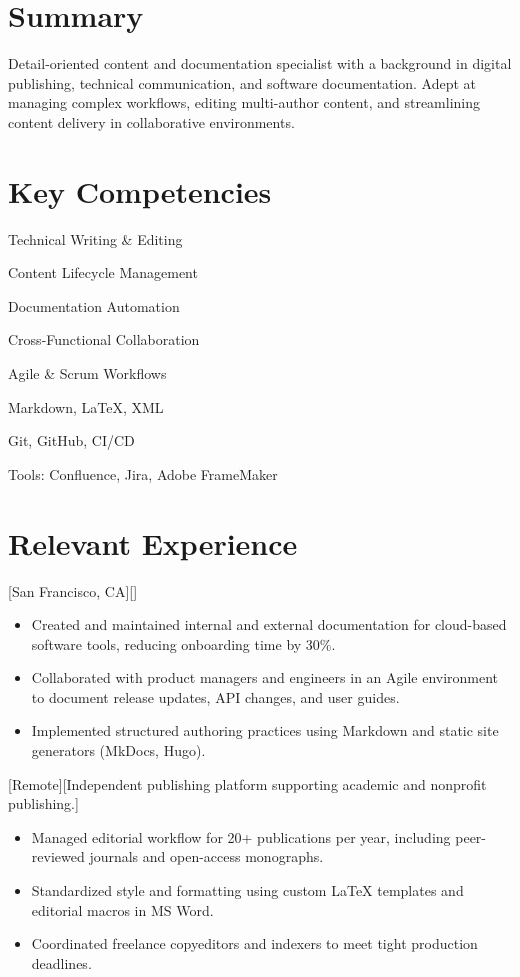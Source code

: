 \documentclass{stitched}
\begin{document}
\section*{Summary}
Detail-oriented content and documentation specialist with a background in digital publishing, technical communication, and software documentation. Adept at managing complex workflows, editing multi-author content, and streamlining content delivery in collaborative environments.
\section*{Key Competencies}
\begin{skills}
\item Technical Writing \& Editing
\item Content Lifecycle Management
\item Documentation Automation
\item Cross-Functional Collaboration
\item Agile \& Scrum Workflows
\item Markdown, LaTeX, XML
\item Git, GitHub, CI/CD
\item Tools: Confluence, Jira, Adobe FrameMaker

\end{skills}

\section*{Relevant Experience}

        [San Francisco, CA][]
        \begin{itemize}
  \item Created and maintained internal and external documentation for cloud-based software tools, reducing onboarding time by 30\%.
  \item Collaborated with product managers and engineers in an Agile environment to document release updates, API changes, and user guides.
  \item Implemented structured authoring practices using Markdown and static site generators (MkDocs, Hugo).
\end{itemize}


        [Remote][Independent publishing platform supporting academic and nonprofit publishing.]
        \begin{itemize}
  \item Managed editorial workflow for 20+ publications per year, including peer-reviewed journals and open-access monographs.
  \item Standardized style and formatting using custom LaTeX templates and editorial macros in MS Word.
  \item Coordinated freelance copyeditors and indexers to meet tight production deadlines.
\end{itemize}
\end{document}
